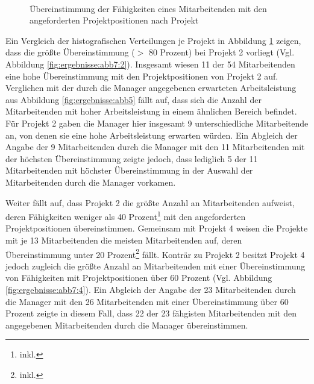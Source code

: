 \begin{figure}
    \\
\caption[Übereinstimmung der der Fähigkeiten eines Mitarbeitenden mit den angeforderten Projektpositionen nach Projekt]{Übereinstimmung der Fähigkeiten eines Mitarbeitenden mit den angeforderten Projektpositionen nach Projekt}
  \label{fig:ergebnisse:abb7}
\end{figure}

Ein Vergleich der histografischen Verteilungen je Projekt in Abbildung \ref{fig:ergebnisse:abb7} zeigen, dass die größte Übereinstimmung ($>$ 80 Prozent) bei Projekt 2 vorliegt (Vgl. Abbildung \ref{fig:ergebnisse:abb7:2}).
Insgesamt wiesen 11 der 54 Mitarbeitenden eine hohe Übereinstimmung mit den Projektpositionen von Projekt 2 auf.
Verglichen mit der durch die Manager angegebenen erwarteten Arbeitsleistung aus Abbildung \ref{fig:ergebnisse:abb5} fällt auf, dass sich die Anzahl der Mitarbeitenden mit hoher Arbeitsleistung in einem ähnlichen Bereich befindet.
Für Projekt 2 gaben die Manager hier insgesamt 9 unterschiedliche Mitarbeitende an, von denen sie eine hohe Arbeitsleistung erwarten würden.
Ein Abgleich der Angabe der 9 Mitarbeitenden durch die Manager mit den 11 Mitarbeitenden mit der höchsten Übereinstimmung zeigte jedoch, dass lediglich 5 der 11 Mitarbeitenden mit höchster Übereinstimmung in der Auswahl der Mitarbeitenden durch die Manager vorkamen.

Weiter fällt auf, dass Projekt 2 die größte Anzahl an Mitarbeitenden aufweist, deren Fähigkeiten weniger als 40 Prozent\footnote{inkl.} mit den angeforderten Projektpositionen übereinstimmen.
Gemeinsam mit Projekt 4 weisen die Projekte mit je 13 Mitarbeitenden die meisten Mitarbeitenden auf, deren Übereinstimmung unter 20 Prozent\footnote{inkl.} fällt.
Konträr zu Projekt 2 besitzt Projekt 4 jedoch zugleich die größte Anzahl an Mitarbeitenden mit einer Übereinstimmung von Fähigkeiten mit Projektpositionen über 60 Prozent (Vgl. Abbildung \ref{fig:ergebnisse:abb7:4}).
Ein Abgleich der Angabe der 23 Mitarbeitenden durch die Manager mit den 26 Mitarbeitenden mit einer Übereinstimmung über 60 Prozent zeigte in diesem Fall, dass 22 der 23 fähgisten Mitarbeitenden mit den angegebenen Mitarbeitenden durch die Manager übereinstimmen.

